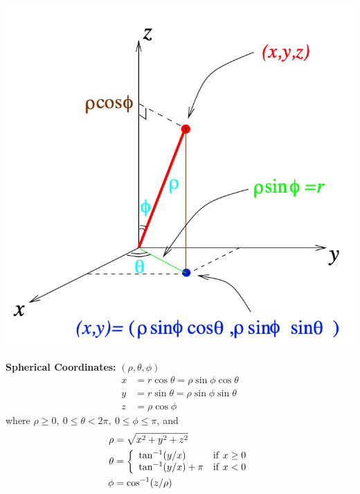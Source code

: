 \documentclass[11pt, a4paper]{MATH2023}
\begin{document}
\begin{spacing}{1.3}
\begin{center}
        \includegraphics[scale=0.4]{images/Ch10-spherical-coor.png}
    \end{center}

    {\bf Spherical Coordinates: } $(\rho, \theta,\phi)$
    \begin{align*}
        x &= r\cos\theta=\rho\sin\phi\cos\theta\\
        y &= r\sin\theta=\rho\sin\phi\sin\theta\\
        z &= \rho\cos\phi
    \end{align*}
    where $\rho\ge 0,\ 0\le \theta<2\pi,\ 0\le \phi\le \pi$, and 
    \begin{align*}
        \rho &= \sqrt{x^2+y^2+z^2}\\
        \theta &= \left\{ \begin{array}{ll}
            \tan^{-1}(y/x) & {\rm if}\ x\ge 0\\
            \tan^{-1}(y/x)+\pi & {\rm if}\ x<0
        \end{array}\right.\\
        \phi &= \cos^{-1}(z/\rho)
    \end{align*}


\end{spacing}
\end{document}
